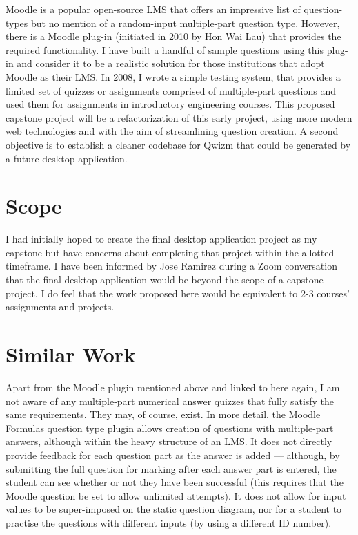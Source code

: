 \documentclass{tufte-handout}
\begin{document}
\parm
Moodle is a popular open-source LMS that offers an impressive list of question-types but no mention of a random-input multiple-part question type. However, there is a Moodle plug-in (initiated in 2010 by Hon Wai Lau) that provides the required functionality. I have built a handful of sample questions using this plug-in and consider it to be a realistic solution for those institutions that adopt Moodle as their LMS.
\newpage
In 2008, I wrote a simple testing system, that provides a limited set of quizzes or assignments comprised of multiple-part questions and used them for assignments in introductory engineering courses.
\parm
This proposed capstone project will be a refactorization of this early project, using more modern web technologies and with the aim of streamlining question creation. A second objective is to establish a cleaner codebase for Qwizm that could be generated by a future desktop application.

\section{\Large Scope}

I had initially hoped to create the final desktop application project as my capstone but have concerns about completing that project within the allotted timeframe. I have been informed by Jose Ramirez during a Zoom conversation that the final desktop application would be beyond the scope of a capstone project. I do feel that the work proposed here would be equivalent to 2-3 courses' assignments and projects.

\section{\Large Similar Work}
Apart from the Moodle plugin mentioned above and linked to here again, I am not aware of any multiple-part numerical answer quizzes that fully satisfy the same requirements. They may, of course, exist.
\parm
In more detail, the Moodle Formulas question type plugin allows creation of questions with multiple-part answers, although within the heavy structure of an LMS. It does not directly provide feedback for each question part as the answer is added --- although, by submitting the full question for marking after each answer part is entered, the student can see whether or not they have been successful (this requires that the Moodle question be set to allow unlimited attempts). It does not allow for input values to be super-imposed on the static question diagram, nor for a student to practise the questions with different inputs (by using a different ID number).
\end{document}
